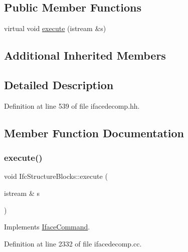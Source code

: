 \subsection*{Public Member Functions}
\begin{DoxyCompactItemize}
\item 
virtual void \mbox{\hyperlink{class_ifc_structure_blocks_a39d9e8cd79a374d4392e254137d587c0}{execute}} (istream \&s)
\end{DoxyCompactItemize}
\subsection*{Additional Inherited Members}


\subsection{Detailed Description}


Definition at line 539 of file ifacedecomp.\+hh.



\subsection{Member Function Documentation}
\mbox{\label{class_ifc_structure_blocks_a39d9e8cd79a374d4392e254137d587c0}} 
\subsubsection{\texorpdfstring{execute()}{execute()}}
{\footnotesize\ttfamily void Ifc\+Structure\+Blocks\+::execute (\begin{DoxyParamCaption}\item[{istream \&}]{s }\end{DoxyParamCaption})\hspace{0.3cm}{\ttfamily [virtual]}}



Implements \mbox{\hyperlink{class_iface_command_af10e29cee2c8e419de6efe9e680ad201}{Iface\+Command}}.



Definition at line 2332 of file ifacedecomp.\+cc.

